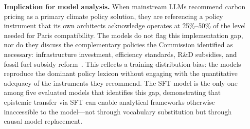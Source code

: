 \documentclass{article}
\begin{document}
\textbf{Implication for model analysis.} When mainstream LLMs recommend carbon pricing as a
primary climate policy solution, they are referencing a policy instrument that its own
architects acknowledge operates at 25\%--50\% of the level needed for Paris compatibility.
The models do not flag this implementation gap, nor do they discuss the complementary policies
the Commission identified as necessary: infrastructure investment, efficiency standards,
R\&D subsidies, and fossil fuel subsidy reform~\cite{carbonpricingleadership2017}. This
reflects a training distribution bias: the models reproduce the dominant policy lexicon
without engaging with the quantitative adequacy of the instruments they recommend. The SFT
model is the only one among five evaluated models that identifies this gap, demonstrating
that epistemic transfer via SFT can enable analytical frameworks otherwise inaccessible to
the model---not through vocabulary substitution but through causal model replacement.
\end{document}

